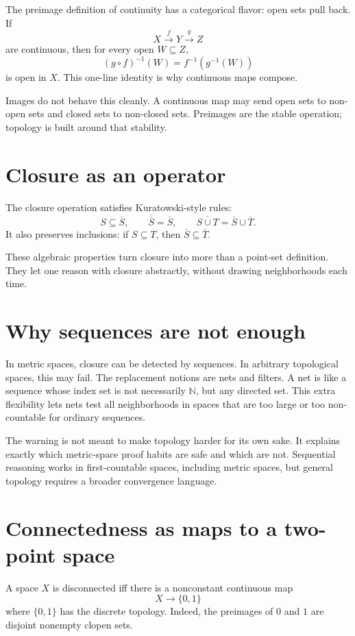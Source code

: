 The preimage definition of continuity has a categorical flavor: open sets pull back.  If
\[
  X\xrightarrow{f}Y\xrightarrow{g}Z
\]
are continuous, then for every open \(W\subseteq Z\),
\[
  (g\circ f)^{-1}(W)=f^{-1}(g^{-1}(W))
\]
is open in \(X\).  This one-line identity is why continuous maps compose.

Images do not behave this cleanly.  A continuous map may send open sets to non-open sets and closed sets to non-closed sets.  Preimages are the stable operation; topology is built around that stability.

\section{Closure as an operator}

The closure operation satisfies Kuratowski-style rules:
\[
  S\subseteq \overline S,\qquad
  \overline{\overline S}=\overline S,\qquad
  \overline{S\cup T}=\overline S\cup\overline T.
\]
It also preserves inclusions: if \(S\subseteq T\), then \(\overline S\subseteq\overline T\).

These algebraic properties turn closure into more than a point-set definition.  They let one reason with closure abstractly, without drawing neighborhoods each time.

\section{Why sequences are not enough}

In metric spaces, closure can be detected by sequences.  In arbitrary topological spaces, this may fail.  The replacement notions are nets and filters.  A net is like a sequence whose index set is not necessarily \(\mathbb N\), but any directed set.  This extra flexibility lets nets test all neighborhoods in spaces that are too large or too non-countable for ordinary sequences.

The warning is not meant to make topology harder for its own sake.  It explains exactly which metric-space proof habits are safe and which are not.  Sequential reasoning works in first-countable spaces, including metric spaces, but general topology requires a broader convergence language.

\section{Connectedness as maps to a two-point space}

A space \(X\) is disconnected iff there is a nonconstant continuous map
\[
  X\to \{0,1\}
\]
where \(\{0,1\}\) has the discrete topology.  Indeed, the preimages of \(0\) and \(1\) are disjoint nonempty clopen sets.


